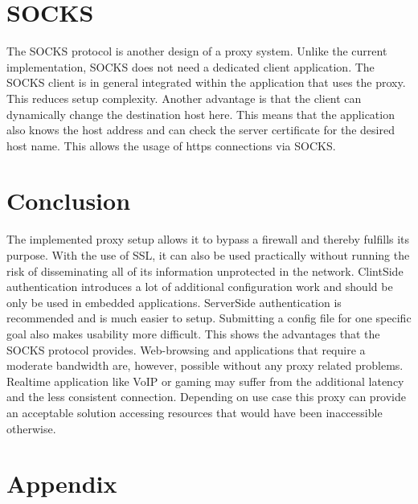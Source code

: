\documentclass[12pt, a4paper]{scrartcl}
\begin{document}
\section{SOCKS}
The SOCKS protocol is another design of a proxy system. Unlike the current implementation, SOCKS does not need a dedicated client application. The SOCKS client is in general integrated within the application that uses the proxy. This reduces setup complexity. Another advantage is that the client can dynamically change the destination host here. This means that the application also knows the host address and can check the server certificate for the desired host name. This allows the usage of https connections via SOCKS.

\section{Conclusion}
The implemented proxy setup allows it to bypass a firewall and thereby fulfills its purpose. With the use of \ac{SSL}, it can also be used practically without running the risk of disseminating all of its information unprotected in the network. ClintSide authentication introduces a lot of additional configuration work and should be only be used in embedded applications. ServerSide authentication is recommended and is much easier to setup.\newline
Submitting a config file for one specific goal also makes usability more difficult. This shows the advantages that the SOCKS protocol provides. Web-browsing and applications that require a moderate bandwidth are, however, possible without any proxy related problems. Realtime application like \ac{VoIP} or gaming may suffer from the additional latency and the less consistent connection.\newline
Depending on use case this proxy can provide an acceptable solution accessing resources that would have been inaccessible otherwise.

\newpage
\renewcommand{\thesubsection}{\Alph{subsection}}
\setcounter{page}{\value{lastroman}}
\section*{Appendix}


\newpage
\listoffigures

\end{document}
